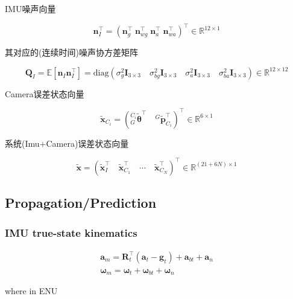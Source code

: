 \documentclass[12pt,a4paper]{article}
\begin{document}
IMU噪声向量

\begin{equation*}
\mathbf{n}_I^\top = 
\left(\mathbf{n}_g^\top \; \mathbf{n}_{wg}^\top \; \mathbf{n}_a^\top \; \mathbf{n}_{wa}^\top\right)^\top
\in \mathbb{R}^{12 \times 1}
\end{equation*}

其对应的(连续时间)噪声协方差矩阵

\begin{equation*}
\mathbf{Q}_I 
= \mathbb{E}\left[\mathbf{n}_I^{}\mathbf{n}_I^\top\right]
= \text{diag}\left( 
\sigma_{g}^2  \mathbf{I}_{3\times3 } \quad
\sigma_{bg}^2 \mathbf{I}_{3\times3 } \quad
\sigma_{a}^2  \mathbf{I}_{3\times3 } \quad
\sigma_{ba}^2 \mathbf{I}_{3\times3 } 
\right)
\in \mathbb{R}^{12 \times 12}
\end{equation*}

Camera误差状态向量

\begin{equation*}
\tilde{\mathbf{x}}_{C_i} = 
\left(
{}^{C_i}_G\tilde{\boldsymbol{\theta}}^\top \quad
{}^G\tilde{\mathbf{p}}_{C_i}^\top
\right)^\top
\in \mathbb{R}^{6 \times 1}
\end{equation*}

系统(Imu+Camera)误差状态向量

\begin{equation*}
\tilde{\mathbf{x}} = 
\left(
\tilde{\mathbf{x}}_I^\top \quad
\tilde{\mathbf{x}}_{C_1}^\top \quad
\cdots \quad 
\tilde{\mathbf{x}}_{C_N}^\top
\right)^\top
\in \mathbb{R}^{(21+6N) \times 1}
\end{equation*}


\subsection{Propagation/Prediction}

\subsubsection{IMU true-state kinematics}

$$
\begin{array}{l}
\mathbf{a}_{m}=\mathbf{R}_{t}^{\top}\left(\mathbf{a}_{t}-\mathbf{g}_{t}\right)+\mathbf{a}_{b t}+\mathbf{a}_{n} \\
\boldsymbol{\omega}_{m}=\boldsymbol{\omega}_{t}+\boldsymbol{\omega}_{b t}+\boldsymbol{\omega}_{n}
\end{array}
$$

where in ENU
\end{document}
